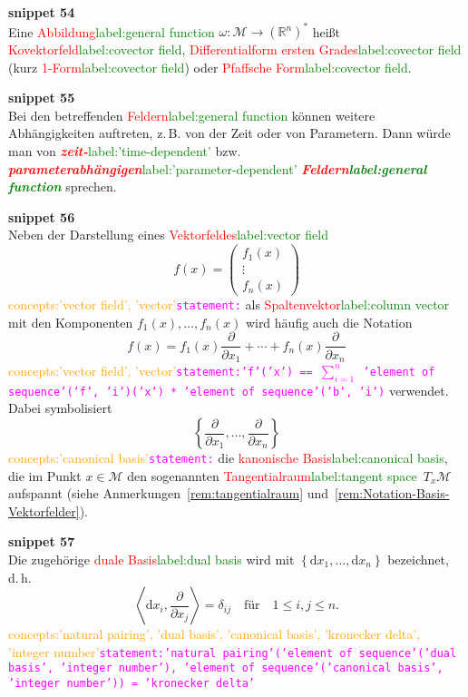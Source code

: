 \documentclass[a4paper,twoside,english,ngerman,deutsch,german,sectrefs,envcountsame,envcountchap]{svmono}
\newcommand{\setref}[2]{\textcolor{red}{#1}\textcolor{green}{#2}}
\newcommand{\snippet}[1]{\textbf{snippet #1}\\}
\newcommand{\eqnote}[2]{\textcolor{orange}{#1}\textcolor{magenta}{\texttt{#2}}}
\begin{document}
\snippet{54}
Eine \setref{Abbildung}{label:general function} $\omega:\mathcal{M}\to({\mathbb{R}}^{n})^{*}$ heißt \setref{Kovektorfeld}{label:covector field}, \setref{Differentialform ersten Grades}{label:covector field} (kurz \setref{1-Form}{label:covector field}) oder \setref{Pfaffsche Form}{label:covector field}.

\snippet{55}
Bei den betreffenden
\setref{Feldern}{label:general function} können weitere Abhängigkeiten auftreten, z.\,B. von der Zeit
oder von Parametern. Dann würde man von \setref{\textbf{\em zeit-}}{label:'time-dependent'} bzw. \setref{\textbf{\em parameterabhängigen}}{label:'parameter-dependent'}
\textbf{\em \setref{Feldern}{label:general function}} sprechen.

\snippet{56}

Neben der Darstellung eines \setref{Vektorfeldes}{label:vector field}
\[
f(x)=\left(\begin{array}{c} f_{1}(x)\\
\vdots\\
f_{n}(x)
\end{array}\right)
\]\eqnote{concepts:'vector field', 'vector'}{statement:{}}
als \setref{Spaltenvektor}{label:column vector} mit den Komponenten $f_{1}(x),\ldots,f_{n}(x)$ wird häufig auch die Notation
\begin{equation}
f(x)=f_{1}(x)\frac{\partial}{\partial x_{1}}+\cdots+f_{n}(x)\frac{\partial}{\partial x_{n}}\label{eq:Basisdarstellung-Vektorfelder}
\end{equation}\eqnote{concepts:'vector field', 'vector'}{statement:'f'('x') == $\sum_{i=1}^n$ 'element of sequence'('f', 'i')('x') * 'element of sequence'('b', 'i')}
verwendet. Dabei symbolisiert
\begin{equation}
\left\{ \frac{\partial}{\partial x_{1}},\ldots,\frac{\partial}{\partial x_{n}}\right\} \label{eq:Basisvektorfelder}
\end{equation}\eqnote{concepts:'canonical basis'}{statement:}
die \setref{kanonische Basis}{label:canonical basis}, die im Punkt $x\in\mathcal{M}$ den sogenannten
\setref{Tangential\-raum}{label:tangent space}~$T_{x}\mathcal{M}$
aufspannt (siehe Anmerkungen~\ref{rem:tangentialraum} und~\ref{rem:Notation-Basis-Vektorfelder}).

\snippet{57}
Die zugehörige \setref{duale Basis}{label:dual basis} wird mit $\left\{ {\mathrm{d}} x_{1},\dots,{\mathrm{d}} x_{n}\right\} $ bezeichnet, d.\,h.
\[
\left\langle {\mathrm{d}} x_{i},\frac{\partial}{\partial x_{j}}\right\rangle =\delta_{ij}\quad\textrm{für}\quad1\leq i,j\leq n.
\]\eqnote{concepts:'natural pairing', 'dual basis', 'canonical basis', 'kronecker delta', 'integer number'}{statement:'natural pairing'('element of sequence'('dual basis', 'integer number'), 'element of sequence'('canonical basis', 'integer number')) = 'kronecker delta'}
\end{document}
